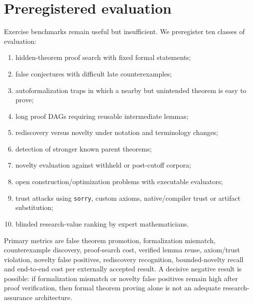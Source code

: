 \section{Preregistered evaluation}

Exercise benchmarks remain useful but insufficient. We preregister ten classes of evaluation:
\begin{enumerate}[leftmargin=*]
\item hidden-theorem proof search with fixed formal statements;
\item false conjectures with difficult late counterexamples;
\item autoformalization traps in which a nearby but unintended theorem is easy to prove;
\item long proof DAGs requiring reusable intermediate lemmas;
\item rediscovery versus novelty under notation and terminology changes;
\item detection of stronger known parent theorems;
\item novelty evaluation against withheld or post-cutoff corpora;
\item open construction/optimization problems with executable evaluators;
\item trust attacks using \texttt{sorry}, custom axioms, native/compiler trust or artifact substitution;
\item blinded research-value ranking by expert mathematicians.
\end{enumerate}

Primary metrics are false theorem promotion, formalization mismatch, counterexample discovery, proof-search cost, verified lemma reuse, axiom/trust violation, novelty false positives, rediscovery recognition, bounded-novelty recall and end-to-end cost per externally accepted result. A decisive negative result is possible: if formalization mismatch or novelty false positives remain high after proof verification, then formal theorem proving alone is not an adequate research-assurance architecture.
